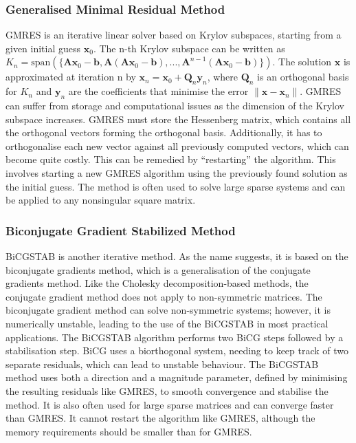 \subsubsection{Generalised Minimal Residual Method}
GMRES is an iterative linear solver based on Krylov subspaces, starting from a given initial guess $\textbf{x}_0$. The n-th Krylov subspace can be written as $K_n = \mathrm{span}(\{\textbf{A}\textbf{x}_0-\textbf{b}, \textbf{A}(\textbf{A}\textbf{x}_0-\textbf{b}),...,\textbf{A}^{n-1}(\textbf{A}\textbf{x}_0-\textbf{b})\})$. The solution $\textbf{x}$ is approximated at iteration n by $\textbf{x}_n = \textbf{x}_0 + \textbf{Q}_n \textbf{y}_n$, where $\textbf{Q}_n$ is an orthogonal basis for $K_n$ and $\textbf{y}_n$ are the coefficients that minimise the error $\|\textbf{x}-\textbf{x}_n\|$. GMRES can suffer from storage and computational issues as the dimension of the Krylov subspace increases. GMRES must store the Hessenberg matrix, which contains all the orthogonal vectors forming the orthogonal basis. Additionally, it has to orthogonalise each new vector against all previously computed vectors, which can become quite costly. This can be remedied by ``restarting'' the algorithm. This involves starting a new GMRES algorithm using the previously found solution as the initial guess. The method is often used to solve large sparse systems and can be applied to any nonsingular square matrix\cite{he_parallel_2023}.


\subsubsection{Biconjugate Gradient Stabilized Method}
BiCGSTAB is another iterative method. As the name suggests, it is based on the biconjugate gradients method, which is a generalisation of the conjugate gradients method. Like the Cholesky decomposition-based methods, the conjugate gradient method does not apply to non-symmetric matrices. The biconjugate gradient method can solve non-symmetric systems; however, it is numerically unstable, leading to the use of the BiCGSTAB in most practical applications. The BiCGSTAB algorithm performs two BiCG steps followed by a stabilisation step. BiCG uses a biorthogonal system, needing to keep track of two separate residuals, which can lead to unstable behaviour. The BiCGSTAB method uses both a direction and a magnitude parameter, defined by minimising the resulting residuals like GMRES, to smooth convergence and stabilise the method. It is also often used for large sparse matrices \cite{yang_improved_2002,krasnopolsky_revisiting_2020} and can converge faster than GMRES. It cannot restart the algorithm like GMRES, although the memory requirements should be smaller than for GMRES. 
